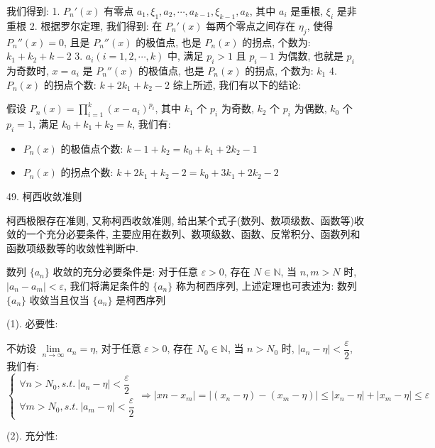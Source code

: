 \begin{anymark}[证明]
	我们得到:
	1. $P_{n}'(x)$ 有零点 $a_{1},\xi_{1},a_{2},\cdots,a_{k-1},\xi_{k-1},a_{k}$, 其中 $a_{i}$ 是重根, $\xi_{i}$ 是非重根
	2. 根据罗尔定理, 我们得到: 在 $P_{n}'(x)$ 每两个零点之间存在 $\eta_{j}$, 使得 $P_{n}''(x) = 0$, 且是 $P_{n}''(x)$ 的极值点, 也是 $P_{n}(x)$ 的拐点, 个数为: $k_{1}+k_{2}+k-2$
	3. $a_{i}(i=1,2,\cdots,k)$ 中, 满足 $p_{i} > 1$ 且 $p_{i}-1$ 为偶数, 也就是 $p_{i}$ 为奇数时, $x = a_{i}$ 是 $P_{n}''(x)$ 的极值点, 也是 $P_{n}(x)$ 的拐点, 个数为: $k_{1}$
	4. $P_{n}(x)$ 的拐点个数: $k+2k_{1}+k_{2}-2$
	综上所述, 我们有以下的结论:
	\begin{corollary}[极值点和拐点个数]
		假设 $P_{n}(x)=\prod\limits_{i=1}^{k}(x-a_{i})^{p_{i}}$, 其中 $k_{1}$ 个 $p_{i}$ 为奇数, $k_{2}$ 个 $p_{i}$ 为偶数, $k_{0}$ 个 $p_{i}=1$, 满足 $k_{0}+k_{1}+k_{2} = k$, 我们有:
		\begin{itemize}
			\item $P_{n}(x)$ 的极值点个数: $k-1+k_{2} = k_{0}+k_{1}+2k_{2}-1$
			\item $P_{n}(x)$ 的拐点个数: $k+2k_{1}+k_{2}-2 = k_{0}+3k_{1}+2k_{2}-2$
		\end{itemize}
	\end{corollary}
\end{anymark}

49. 柯西收敛准则

\begin{theorem}[柯西收敛准则]\label{the: 柯西收敛准则}
	柯西极限存在准则, 又称柯西收敛准则, 给出某个式子(数列、数项级数、函数等)收敛的一个充分必要条件, 主要应用在数列、数项级数、函数、反常积分、函数列和函数项级数等的收敛性判断中.
\end{theorem}

\begin{proposition}[柯西收敛准则:数列]
	数列 $\{a_{n}\}$ 收敛的充分必要条件是: 对于任意 $\varepsilon > 0$, 存在 $N\in\mathbb{N}$, 当 $n,m>N$ 时, $|a_{n}-a_{m}|<\varepsilon$, 我们将满足条件的 $\{a_{n}\}$ 称为柯西序列, 上述定理也可表述为: 数列 $\{a_{n}\}$ 收敛当且仅当 $\{a_{n}\}$ 是柯西序列
\end{proposition}

\begin{anymark}[证明]
	(1). 必要性:

	不妨设 $\lim\limits_{n\to \infty} a_{n} =\eta$, 对于任意 $\varepsilon > 0$, 存在 $N_{0}\in\mathbb{N}$, 当 $n>N_{0}$ 时, $|a_{n}-\eta|<\dfrac{\varepsilon}{2}$, 我们有:
	$$\begin{cases} 
		\forall n > N_{0}, s.t.\ |a_{n} - \eta| < \dfrac{\varepsilon}{2}\\ 
		\forall m > N_{0}, s.t.\ |a_{m} - \eta| < \dfrac{\varepsilon}{2}
	\end{cases}
	\Rightarrow 
	|x{n}-x_{m}| = |(x_{n} - \eta) - (x_{m} - \eta)| \leq |x_{n} - \eta| + |x_{m}-\eta| \leq \varepsilon$$

	(2). 充分性:


\end{anymark}

